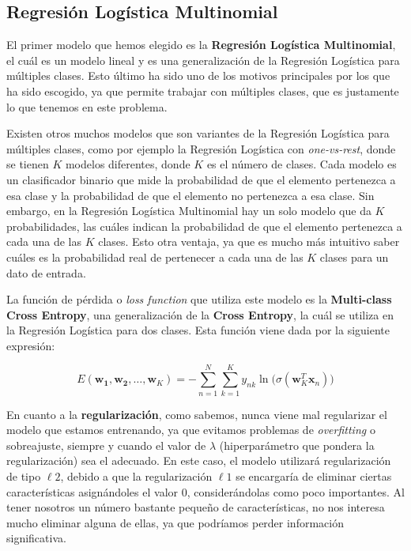 \documentclass[11pt,a4paper]{article}
\begin{document}
\subsection{Regresión Logística Multinomial}

El primer modelo que hemos elegido es la \textbf{Regresión Logística Multinomial}, el cuál es un modelo lineal y es una generalización de la Regresión
Logística para múltiples clases. Esto último ha sido uno de los motivos principales por los que ha sido escogido, ya que permite trabajar con
múltiples clases, que es justamente lo que tenemos en este problema.

Existen otros muchos modelos que son variantes de la Regresión Logística para múltiples clases, como por ejemplo la Regresión Logística con
\textit{one-vs-rest}, donde se tienen $K$ modelos diferentes, donde $K$ es el número de clases. Cada modelo es un clasificador binario que
mide la probabilidad de que el elemento pertenezca a esa clase y la probabilidad de que el elemento no pertenezca a esa clase. Sin embargo,
en la Regresión Logística Multinomial hay un solo modelo que da $K$ probabilidades, las cuáles indican la probabilidad de que el elemento
pertenezca a cada una de las $K$ clases. Esto otra ventaja, ya que es mucho más intuitivo saber cuáles es la probabilidad real de pertenecer
a cada una de las $K$ clases para un dato de entrada.

La función de pérdida o \textit{loss function} que utiliza este modelo es la \textbf{Multi-class Cross Entropy}, una generalización de la
\textbf{Cross Entropy}, la cuál se utiliza en la Regresión Logística para dos clases. Esta función viene dada por la siguiente expresión:

\begin{equation}
\label{eq:mult-cross-entropy}
E(\mathbf{w_1}, \mathbf{w_2}, \dots, \mathbf{w}_K) = -\sum_{n=1}^N \sum_{k=1}^{K} y_{nk} \ln \Big(\sigma (\mathbf{w}_K^T \mathbf{x}_n)\Big)
\end{equation}

En cuanto a la \textbf{regularización}, como sabemos, nunca viene mal regularizar el modelo que estamos entrenando, ya que evitamos problemas de
\textit{overfitting} o sobreajuste, siempre y cuando el valor de $\lambda$ (hiperparámetro que pondera la regularización) sea el adecuado. 
En este caso, el modelo utilizará regularización de tipo $\ell 2$, debido a que la regularización $\ell 1$ se encargaría de eliminar ciertas
características asignándoles el valor 0, considerándolas como poco importantes. Al tener nosotros un número bastante pequeño de
características, no nos interesa mucho eliminar alguna de ellas, ya que podríamos perder información significativa.
\end{document}
